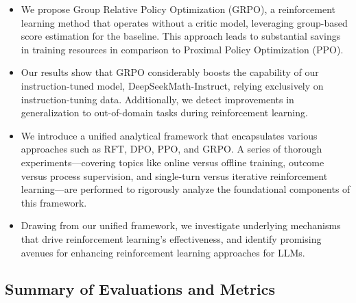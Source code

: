 \begin{itemize}[topsep=0pt]
    \item We propose Group Relative Policy Optimization (GRPO), a reinforcement learning method that operates without a critic model, leveraging group-based score estimation for the baseline. This approach leads to substantial savings in training resources in comparison to Proximal Policy Optimization (PPO).
    \item Our results show that GRPO considerably boosts the capability of our instruction-tuned model, DeepSeekMath-Instruct, relying exclusively on instruction-tuning data. Additionally, we detect improvements in generalization to out-of-domain tasks during reinforcement learning.
    \item We introduce a unified analytical framework that encapsulates various approaches such as RFT, DPO, PPO, and GRPO. A series of thorough experiments—covering topics like online versus offline training, outcome versus process supervision, and single-turn versus iterative reinforcement learning—are performed to rigorously analyze the foundational components of this framework.
    \item Drawing from our unified framework, we investigate underlying mechanisms that drive reinforcement learning's effectiveness, and identify promising avenues for enhancing reinforcement learning approaches for LLMs.
\end{itemize}

\subsection{Summary of Evaluations and Metrics}

